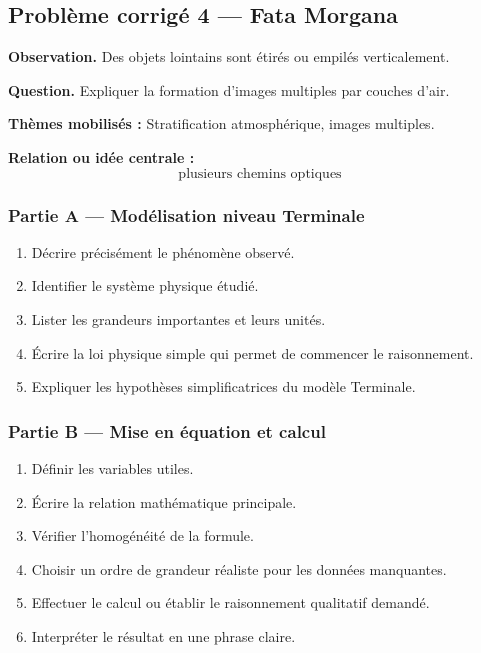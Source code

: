 \documentclass[11pt,a4paper]{article}
\begin{document}
\subsection{Problème corrigé 4 — Fata Morgana}

\begin{exercicebox}
\textbf{Observation.} Des objets lointains sont étirés ou empilés verticalement.

\medskip
\textbf{Question.} Expliquer la formation d'images multiples par couches d'air.

\medskip
\textbf{Thèmes mobilisés :} Stratification atmosphérique, images multiples.

\medskip
\textbf{Relation ou idée centrale :}
\[
\text{plusieurs chemins optiques}
\]
\end{exercicebox}

\subsubsection*{Partie A — Modélisation niveau Terminale}

\begin{enumerate}
  \item Décrire précisément le phénomène observé.
  \item Identifier le système physique étudié.
  \item Lister les grandeurs importantes et leurs unités.
  \item Écrire la loi physique simple qui permet de commencer le raisonnement.
  \item Expliquer les hypothèses simplificatrices du modèle Terminale.
\end{enumerate}

\subsubsection*{Partie B — Mise en équation et calcul}

\begin{enumerate}
  \item Définir les variables utiles.
  \item Écrire la relation mathématique principale.
  \item Vérifier l'homogénéité de la formule.
  \item Choisir un ordre de grandeur réaliste pour les données manquantes.
  \item Effectuer le calcul ou établir le raisonnement qualitatif demandé.
  \item Interpréter le résultat en une phrase claire.
\end{enumerate}
\end{document}
